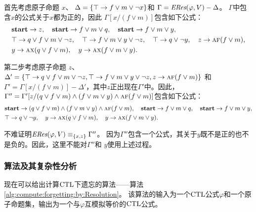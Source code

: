 \begin{example}\label{examp:Aclm}
	首先考虑原子命题 $x$、 $\Delta=\{\top \rightarrow f \vee m \vee \neg x\}$和 $\Gamma=\emph{ERes}(\varphi,V)-\Delta$。
	$\Gamma$中包含$x$的公式关于$x$都为正的，因此 $\Gamma[x/(f \vee m)]$包含如下公式：
	\begin{align*}%
		& \start\rto z, \quad \start \rto f\vee m \vee q, \quad  \start \rto f \vee m \vee y, \\
		& \top \rto q \vee f \vee m \vee \neg z, \quad 	\top \rto f \vee m \vee y \vee \neg z,
		\quad \top \rto q\vee\neg y , \quad z \rto \ALL \FUTURE (f \vee m), \\
		& y \rto \ALL\NEXT(q \vee f\vee m), %
		\quad 	y \rto \ALL\NEXT(f\vee m\vee y).
	\end{align*}
	
	第二步考虑原子命题 $z$、
	$\Delta'=\{ \top \rightarrow q \vee f \vee m \vee \neg z, \top \rightarrow f \vee m \vee y \vee \neg z ,z \rightarrow \textsc{a} \textsc{f} (f \vee m)\}$
	和 $\Gamma'=\Gamma[x/(f \vee m)] -\Delta'$，其中$z$正出现在$\Gamma'$中。因此，
	$\Gamma''=\Gamma'[z/ (q \vee f \vee m)\land (f \vee m \vee y)\land\textsc{a} \textsc{f} (f \vee m)]$包含如下公式：
	\begin{align*}%
		& \start\rto  (q \vee f \vee m)\land (f \vee m \vee y)\land\ALL \FUTURE (f \vee m),
		\quad \start \rto f\vee m \vee q, \quad  \start \rto f \vee m \vee y,  \\
		&  \top \rto q\vee\neg y,  \quad y \rto \ALL\NEXT(q \vee f\vee m), \quad y \rto \ALL\NEXT(f\vee m\vee y).
	\end{align*}
	
	不难证明$\emph{ERes}(\varphi,V)\equiv_{\{x,z\}} \Gamma''$。
	因为$\Gamma''$包含一个公式，其关于$y$既不是正的也不是负的。因此，这里不能对$\Gamma''$和 $y$使用上述过程。 
\end{example}


\subsubsection{算法及其复杂性分析}
\label{cha4:sec:alg}
现在可以给出计算$\textrm{CTL}$下遗忘的算法——算法\ref{alg:compute:forgetting:by:Resolution}。
该算法的输入为一个$\textrm{CTL}$公式$\varphi$和一个原子命题集，输出为一个与$\varphi$互模拟等价的$\textrm{CTL}$公式。
%


